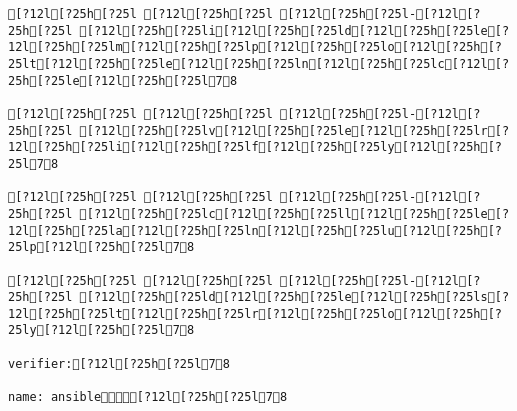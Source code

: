 \documentclass{scrartcl}
\begin{document}
\begin{Verbatim}
[?12l[?25h[?25l [?12l[?25h[?25l [?12l[?25h[?25l-[?12l[?25h[?25l [?12l[?25h[?25li[?12l[?25h[?25ld[?12l[?25h[?25le[?12l[?25h[?25lm[?12l[?25h[?25lp[?12l[?25h[?25lo[?12l[?25h[?25lt[?12l[?25h[?25le[?12l[?25h[?25ln[?12l[?25h[?25lc[?12l[?25h[?25le[?12l[?25h[?25l78

[?12l[?25h[?25l [?12l[?25h[?25l [?12l[?25h[?25l-[?12l[?25h[?25l [?12l[?25h[?25lv[?12l[?25h[?25le[?12l[?25h[?25lr[?12l[?25h[?25li[?12l[?25h[?25lf[?12l[?25h[?25ly[?12l[?25h[?25l78

[?12l[?25h[?25l [?12l[?25h[?25l [?12l[?25h[?25l-[?12l[?25h[?25l [?12l[?25h[?25lc[?12l[?25h[?25ll[?12l[?25h[?25le[?12l[?25h[?25la[?12l[?25h[?25ln[?12l[?25h[?25lu[?12l[?25h[?25lp[?12l[?25h[?25l78

[?12l[?25h[?25l [?12l[?25h[?25l [?12l[?25h[?25l-[?12l[?25h[?25l [?12l[?25h[?25ld[?12l[?25h[?25le[?12l[?25h[?25ls[?12l[?25h[?25lt[?12l[?25h[?25lr[?12l[?25h[?25lo[?12l[?25h[?25ly[?12l[?25h[?25l78

verifier:[?12l[?25h[?25l78

name: ansible[?12l[?25h[?25l78


\end{Verbatim}
\end{document}
